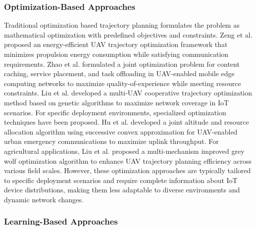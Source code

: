 \documentclass[10pt,conference,letterpaper]{IEEEtran}
\begin{document}
\subsubsection{Optimization-Based Approaches}
Traditional optimization based trajectory planning formulates the problem as mathematical optimization with predefined objectives and constraints. Zeng et al. \cite{DBLP:journals/twc/ZengXZ19} proposed an energy-efficient UAV trajectory optimization framework that minimizes propulsion energy consumption while satisfying communication requirements. Zhao et al. \cite{DBLP:journals/jsac/ZhaoLHHPNQ25} formulated a joint optimization problem for content caching, service placement, and task offloading in UAV-enabled mobile edge computing networks to maximize quality-of-experience while meeting resource constraints. Liu et al. \cite{DBLP:journals/tvt/LiuLCH19} developed a multi-UAV cooperative trajectory optimization method based on genetic algorithms to maximize network coverage in IoT scenarios. For specific deployment environments, specialized optimization techniques have been proposed. Hu et al. \cite{DBLP:journals/iotj/HuWCCC22} developed a joint altitude and resource allocation algorithm using successive convex approximation for UAV-enabled urban emergency communications to maximize uplink throughput. For agricultural applications, Liu et al. \cite{DBLP:journals/eswa/LiuLYZWS23} proposed a multi-mechanism improved grey wolf optimization algorithm to enhance UAV trajectory planning efficiency across various field scales. However, these optimization approaches are typically tailored to specific deployment scenarios and require complete information about IoT device distributions, making them less adaptable to diverse environments and dynamic network changes.




\subsubsection{Learning-Based Approaches}
\end{document}
